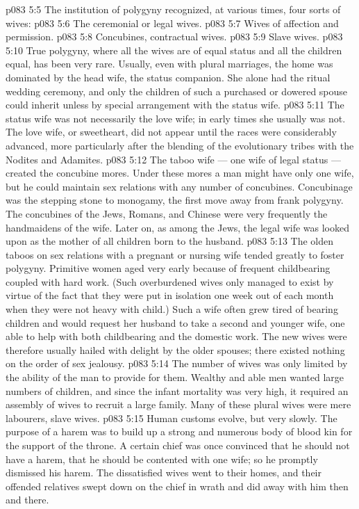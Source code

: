\vs p083 5:5 The institution of polygyny recognized, at various times, four sorts of wives:
\vs p083 5:6 \bibnobreakspace The ceremonial or legal wives.
\vs p083 5:7 \bibnobreakspace Wives of affection and permission.
\vs p083 5:8 \bibnobreakspace Concubines, contractual wives.
\vs p083 5:9 \bibnobreakspace Slave wives.
\vs p083 5:10 \pc True polygyny, where all the wives are of equal status and all the children equal, has been very rare. Usually, even with plural marriages, the home was dominated by the head wife, the status companion. She alone had the ritual wedding ceremony, and only the children of such a purchased or dowered spouse could inherit unless by special arrangement with the status wife.
\vs p083 5:11 The status wife was not necessarily the love wife; in early times she usually was not. The love wife, or sweetheart, did not appear until the races were considerably advanced, more particularly after the blending of the evolutionary tribes with the Nodites and Adamites.
\vs p083 5:12 The taboo wife --- one wife of legal status --- created the concubine mores. Under these mores a man might have only one wife, but he could maintain sex relations with any number of concubines. Concubinage was the stepping stone to monogamy, the first move away from frank polygyny. The concubines of the Jews, Romans, and Chinese were very frequently the handmaidens of the wife. Later on, as among the Jews, the legal wife was looked upon as the mother of all children born to the husband.
\vs p083 5:13 The olden taboos on sex relations with a pregnant or nursing wife tended greatly to foster polygyny. Primitive women aged very early because of frequent childbearing coupled with hard work. (Such overburdened wives only managed to exist by virtue of the fact that they were put in isolation one week out of each month when they were not heavy with child.) Such a wife often grew tired of bearing children and would request her husband to take a second and younger wife, one able to help with both childbearing and the domestic work. The new wives were therefore usually hailed with delight by the older spouses; there existed nothing on the order of sex jealousy.
\vs p083 5:14 The number of wives was only limited by the ability of the man to provide for them. Wealthy and able men wanted large numbers of children, and since the infant mortality was very high, it required an assembly of wives to recruit a large family. Many of these plural wives were mere labourers, slave wives.
\vs p083 5:15 Human customs evolve, but very slowly. The purpose of a harem was to build up a strong and numerous body of blood kin for the support of the throne. A certain chief was once convinced that he should not have a harem, that he should be contented with one wife; so he promptly dismissed his harem. The dissatisfied wives went to their homes, and their offended relatives swept down on the chief in wrath and did away with him then and there.

